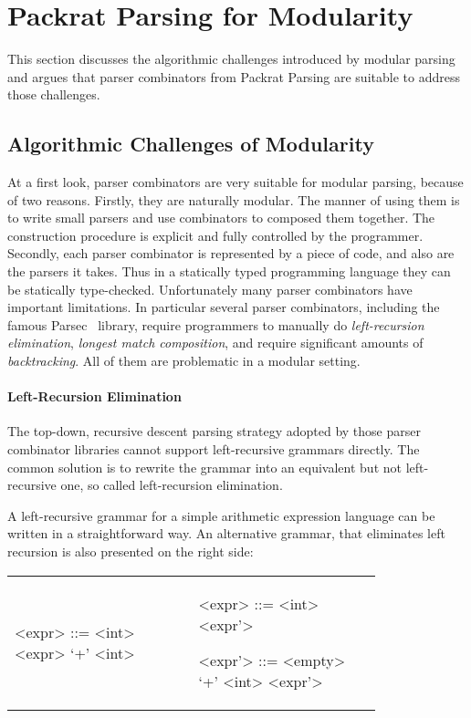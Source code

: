 \section{Packrat Parsing for Modularity}\label{sec:packrat}

This section discusses the algorithmic challenges introduced by modular parsing and argues that parser combinators from Packrat Parsing
are suitable to address those challenges.

\subsection{Algorithmic Challenges of Modularity}
At a first look, parser combinators are very suitable for modular parsing, because of two reasons. Firstly, they are naturally modular. The manner of using them is to write small parsers and use combinators to composed them together. The construction procedure is explicit and fully controlled by the programmer. Secondly, each parser combinator is represented by a piece of code, and also are the parsers it takes. Thus in a statically typed programming language they can be statically type-checked.
Unfortunately many parser combinators have important limitations.
In particular several parser combinators,
including the famous Parsec~\cite{Leijen2001} library, require
programmers to manually do \textit{left-recursion elimination}, \textit{longest match composition}, and
require significant amounts of \textit{backtracking}. All of them are
problematic in a modular setting.

\paragraph{Left-Recursion Elimination} The top-down, recursive descent parsing strategy adopted by those parser combinator libraries cannot support left-recursive grammars directly. The common solution is to rewrite the grammar into an equivalent but not left-recursive one, so called left-recursion elimination.

A left-recursive grammar for a simple arithmetic expression language can be written in a straightforward way. An alternative grammar, that eliminates left recursion is also presented on the right side:

\begin{tabular}{m{0.4\linewidth}m{0.4\linewidth}}
\setlength{\grammarindent}{5em}
\begin{grammar}
<expr> ::= <int> \alt <expr> `+' <int>
\end{grammar}
&
\setlength{\grammarindent}{5em}
\begin{grammar}
<expr> ::= <int> <expr'>

<expr'> ::= <empty> \alt `+' <int> <expr'>
\end{grammar}
\end{tabular}

